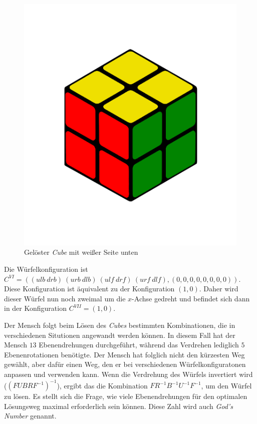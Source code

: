 \documentclass[12pt,a4paper, usenames, dvipsnames]{article}
\theoremstyle{mystyle}
\theoremstyle{definition}
\begin{document}
\begin{figure}[H]
\centering
\includegraphics[scale=0.12]{menschSchritt5.png}
\caption[Lösung von Mensch: Schritt 5]{Gelöster \textit{Cube} mit weißer Seite unten}
\label{Abbildung_LösungMensch5}
\end{figure} 

Die Würfelkonfiguration ist $ C^{VI} = (( \textit{ulb} \ \textit{drb} ) \ ( \textit{urb} \ \textit{dlb} ) \ ( \textit{ulf} \ \textit{drf} ) \ ( \textit{urf} \ \textit{dlf} ), (0,0,0,0,0,0,0,0))$. Diese Konfiguration ist äquivalent zu der Konfiguration $(1,0)$.
Daher wird dieser Würfel nun noch zweimal um die $x$-Achse gedreht und befindet sich dann in der Konfiguration $C^{VII} =(1,0)$.

Der Mensch folgt beim Lösen des \textit{Cubes} bestimmten Kombinationen, die in verschiedenen Situtionen angewandt werden können.  
In diesem Fall hat der Mensch $13$ Ebenendrehungen durchgeführt, während das Verdrehen lediglich $5$ Ebenenrotationen benötigte. Der Mensch hat folglich nicht den kürzesten Weg gewählt, aber dafür einen Weg, den er bei verschiedenen Würfelkonfiguratonen anpassen und verwenden kann. 
Wenn die Verdrehung des Würfels invertiert wird ($(FUBRF^{-1})^{-1}$), ergibt das die Kombination $FR^{-1}B^{-1}U^{-1}F^{-1}$, um den Würfel zu lösen.
Es stellt sich die Frage, wie viele Ebenendrehungen für den optimalen Lösungsweg maximal erforderlich sein können. Diese Zahl wird auch \textit{God's Number} genannt. 
\end{document}
